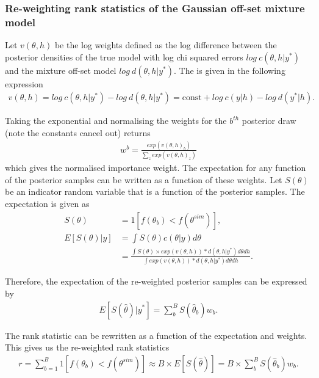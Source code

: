 \documentclass[12pt, a4paper]{article}
\begin{document}
    \subsubsection{Re-weighting rank statistics of the Gaussian off-set mixture model}
    Let $v(\theta, h)$ be the log weights defined as the log difference between the posterior densities of the true model with log chi squared errors $log\: c(\theta, h | y^{\ast})$ and the mixture off-set model $log\:  d(\theta, h | y^{\ast})$. The is given in the following expression
    \begin{align}
        v(\theta, h) = log\: c(\theta, h | y^{\ast}) - log\:  d(\theta, h | y^{\ast}) = \text{const} + log\: c(y|h) - log\: d(y^{\ast} | h).
    \end{align}

    Taking the exponential and normalising the weights for the $b^{th}$ posterior draw (note the constants cancel out) returns
    \begin{align}
    w^b = \frac{exp(v(\theta, h)_b)}{\sum_z exp(v(\theta, h)_z)}
    \end{align}
    which gives the normalised importance weight. The expectation for any function of the posterior samples can be written as a function of these weights. Let $S(\theta)$ be an indicator random variable that is a function of the posterior samples. The expectation is given as
    \begin{align}
    S(\theta) &= 1[f(\theta_b) < f(\theta^{sim})], \\
    E[S(\theta) | y] &= \int S(\theta) c(\theta | y) d\theta\\ 
    &= \frac{\int S(\theta)\times exp(v(\theta, h)) * d(\theta, h | y^{\ast})d\theta d h}{\int exp(v(\theta, h)) * d(\theta, h | y^{\ast})d\theta d h}.
    \end{align}
    
    Therefore, the expectation of the re-weighted posterior samples can be expressed by
    \begin{align}
    E[S(\hat{\theta}) | y^{\ast}] = \sum_b^B S(\hat{\theta}_b)w_b.
    \end{align}

    The rank statistic can be rewritten as a function of the expectation and weights. This gives us the re-weighted rank statistics
    \begin{align}
    r = \sum_{b=1}^{B}1[f(\theta_{b}) < f(\theta^{sim})] \approx  B\times E[S(\hat{\theta})] = B\times \sum_b^B S(\hat{\theta}_b)w_b.
    \end{align}
\end{document}
